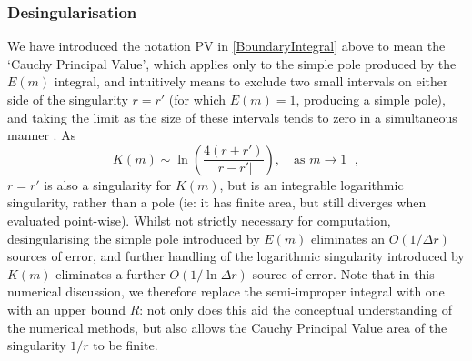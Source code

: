 \documentclass[11pt,a4paper]{article}
\begin{document}
	\subsubsection{Desingularisation} \label{sec:CauchyPV}
	We have introduced the notation $\text{PV}$ in \eqref{BoundaryIntegral} above to mean the `Cauchy Principal Value', which applies only to the simple pole produced by the $E(m)$ integral, and intuitively means to exclude two small intervals on either side of the singularity $r = r'$ (for which $E(m) = 1$, producing a simple pole), and taking the limit as the size of these intervals tends to zero in a simultaneous manner . As 
	\begin{equation}
		\label{KExpansion}
		K(m) \sim \ln \left( \frac{4(r+r')}{|r-r'|} \right), \quad \text{as } m \to 1^-,
	\end{equation}
	$r=r'$ is also a singularity for $K(m)$, but is an integrable logarithmic singularity, rather than a pole (ie: it has finite area, but still diverges when evaluated point-wise). Whilst not strictly necessary for computation, desingularising the simple pole introduced by $E(m)$ eliminates an $O(1/\Delta r)$ sources of error, and further handling of the logarithmic singularity introduced by $K(m)$ eliminates a further $O(1/\ln \Delta r)$ source of error. Note that in this numerical discussion, we therefore replace the semi-improper integral with one with an upper bound $R$: not only does this aid the conceptual understanding of the numerical methods, but also allows the Cauchy Principal Value area of the singularity $1/r$ to be finite.
	
\end{document}
